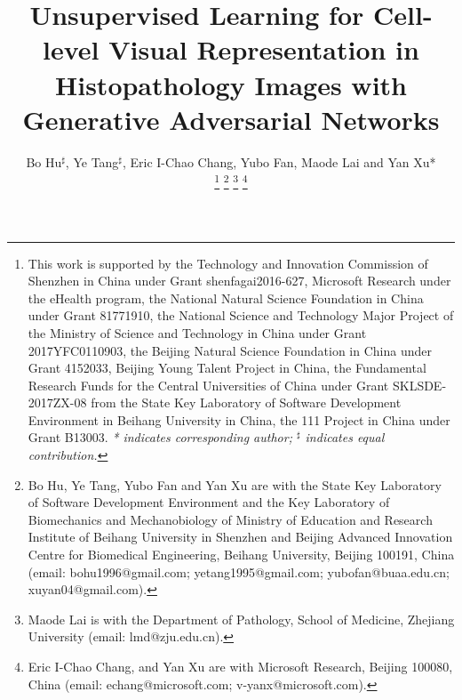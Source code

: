 \documentclass[journal]{IEEEtran}
\begin{document}
%
\title{Unsupervised Learning for Cell-level Visual Representation in Histopathology Images with Generative Adversarial Networks}

\author{Bo Hu$^\sharp$, Ye Tang$^\sharp$, Eric I-Chao Chang, Yubo Fan, Maode Lai and Yan Xu*

\thanks{This work is supported by the Technology and Innovation Commission of Shenzhen in China under Grant shenfagai2016-627, Microsoft Research under the eHealth program, the National Natural Science Foundation in China under Grant 81771910, the National Science and Technology Major Project of the Ministry of Science and Technology in China under Grant 2017YFC0110903, the Beijing Natural Science Foundation in China under Grant 4152033, Beijing Young Talent Project in China, the Fundamental Research Funds for the Central Universities of China under Grant SKLSDE-2017ZX-08 from the State Key Laboratory of Software Development Environment in Beihang University in China, the 111 Project in China under Grant B13003. \emph{* indicates corresponding author; $^\sharp$ indicates equal contribution.}}
\thanks{Bo Hu, Ye Tang, Yubo Fan and Yan Xu are with the State Key Laboratory of Software Development Environment and the Key Laboratory of Biomechanics and Mechanobiology of Ministry of Education and Research Institute of Beihang University in Shenzhen and Beijing Advanced Innovation Centre for Biomedical Engineering, Beihang University, Beijing 100191, China (email: bohu1996@gmail.com; yetang1995@gmail.com; yubofan@buaa.edu.cn; xuyan04@gmail.com).}
\thanks{Maode Lai is with the Department of Pathology, School of Medicine, Zhejiang
University (email: lmd@zju.edu.cn).}
\thanks{Eric I-Chao Chang, and Yan Xu are with Microsoft Research, Beijing 100080, China (email: echang@microsoft.com; v-yanx@microsoft.com).}
}
%
%
%
\end{document}

